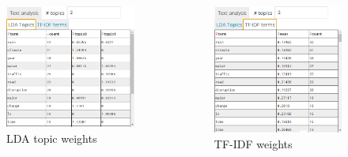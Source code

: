 \documentclass{beamer}
\begin{document}
\begin{frame}
  \begin{columns}[T]
    \begin{figure}
      \includegraphics[width=\textwidth]{../report/images/lda_topics.png}
      \caption{LDA topic weights}
    \end{figure}
    \begin{figure}
      \includegraphics[width=\textwidth, trim={0 0.5cm 0 0},clip]{../report/images/tf_idf.png}
      \caption{TF-IDF weights}
    \end{figure}
  \end{columns}
\end{frame}
\end{document}
